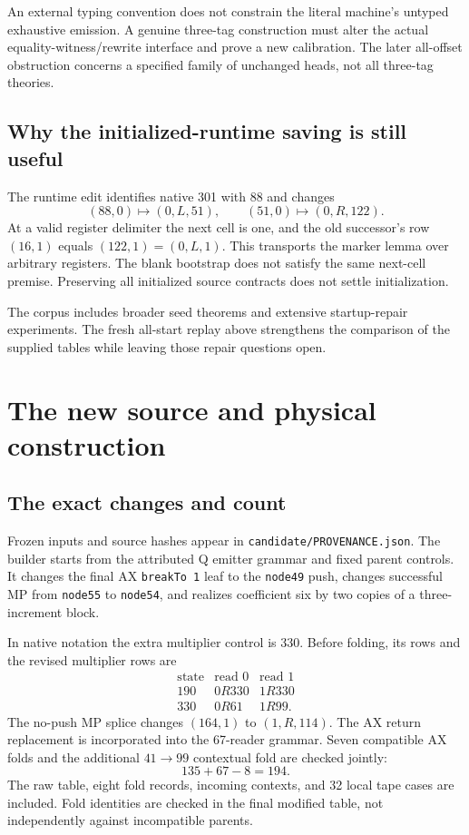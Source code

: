 \documentclass[10pt,letterpaper]{article}
\newcommand{\file}[1]{\texttt{\nolinkurl{#1}}}
\begin{document}
An external typing convention does not constrain the literal machine's
untyped exhaustive emission. A genuine three-tag construction must
alter the actual equality-witness/rewrite interface and prove a new
calibration. The later all-offset obstruction concerns a specified family
of unchanged heads, not all three-tag theories.

\subsection{Why the initialized-runtime saving is still useful}

The runtime edit identifies native 301 with 88 and changes
\[
 (88,0)\mapsto(0,L,51),\qquad (51,0)\mapsto(0,R,122).
\]
At a valid register delimiter the next cell is one, and the old
successor's row $(16,1)$ equals $(122,1)=(0,L,1)$. This transports the
marker lemma over arbitrary registers. The blank bootstrap does not
satisfy the same next-cell premise. Preserving all initialized source
contracts does not settle initialization.

The corpus includes broader seed theorems and extensive startup-repair
experiments. The fresh all-start replay above strengthens the comparison
of the supplied tables while leaving those repair questions open.

\section{The new source and physical construction}
\label{sec:construction}

\subsection{The exact changes and count}

Frozen inputs and source hashes appear in
\file{candidate/PROVENANCE.json}. The builder starts from the attributed
Q emitter grammar and fixed parent controls. It changes the final AX
\texttt{breakTo 1} leaf to the \texttt{node49} push, changes
successful MP from \texttt{node55} to \texttt{node54}, and realizes
coefficient six by two copies of a three-increment block.

In native notation the extra multiplier control is 330. Before folding,
its rows and the revised multiplier rows are
\[
\begin{array}{c|cc}
\text{state}&\text{read }0&\text{read }1\\\hline
190&0R330&1R330\\
330&0R61&1R99 .
\end{array}
\]
The no-push MP splice changes $(164,1)$ to $(1,R,114)$.
The AX return replacement is incorporated into the 67-reader grammar.
Seven compatible AX folds and the additional $41\to99$ contextual fold
are checked jointly:
\[
                         135+67-8=194.
\]
The raw table, eight fold records, incoming contexts, and 32 local tape
cases are included. Fold identities are checked in the final modified
table, not independently against incompatible parents.
\end{document}
